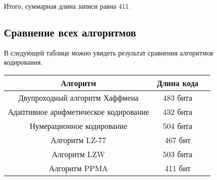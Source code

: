 Итого, суммарная длина записи равна 411.

\newpage

\subsection{Сравнение всех алгоритмов}

В следующей таблице можно увидеть результат сравнения алгоритмов кодирования.

\begin{center}
    \begin{longtable}{|c|c|c|}
       \hline
       Алгоритм&Длина кода \\
       \hline
       Двупроходный алгоритм Хаффмена& 483 бита \\
       \hline
       Адаптивное арифметическое кодирование& 432 бита \\
       \hline
       Нумерационное кодирование & 504 бита \\
       \hline
       Алгоритм LZ-77 & 467 бит \\
       \hline
       Алгоритм LZW & 503 бита \\
       \hline
       Алгоритм PPMA & 411 бит \\
       \hline       
    \end{longtable}
\end{center}

